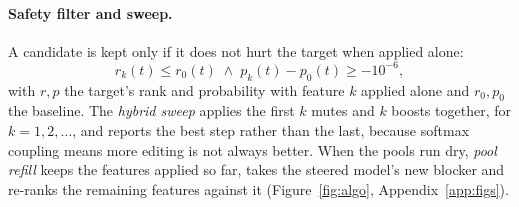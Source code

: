 \documentclass[11pt,twocolumn]{article}
\begin{document}
\paragraph{Safety filter and sweep.} A candidate is kept only if it does not hurt the target when applied alone:
\begin{equation}\label{eq:safe}
r_{k}(t)\le r_{0}(t)\;\wedge\;p_{k}(t)-p_{0}(t)\ge-10^{-6},
\end{equation}
with $r,p$ the target's rank and probability with feature $k$ applied alone and $r_0,p_0$ the baseline. The \emph{hybrid sweep} applies the first $k$ mutes and $k$ boosts together, for $k=1,2,\dots$, and reports the best step rather than the last, because softmax coupling means more editing is not always better. When the pools run dry, \emph{pool refill} keeps the features applied so far, takes the steered model's new blocker and re-ranks the remaining features against it (Figure~\ref{fig:algo}, Appendix~\ref{app:figs}).
\end{document}
